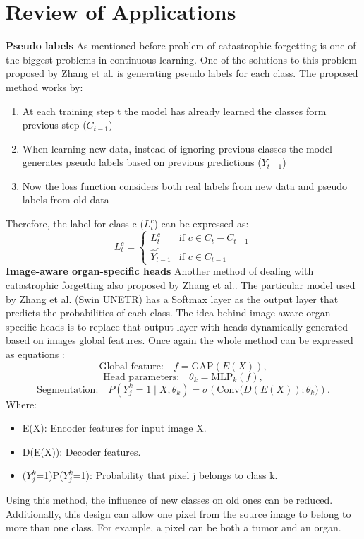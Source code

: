 \documentclass{IEEEcsmag}
\begin{document}
    \section{Review of Applications}
    \textbf{Pseudo labels} As mentioned before problem of catastrophic forgetting is one of the biggest problems in continuous learning.
    One of the solutions to this problem proposed by Zhang et al.\cite{cite-1} is generating pseudo labels for each class.
    The proposed method works by:
    \begin{enumerate}
        \item At each training step t the model has already learned the classes form previous step ($C_{t-1}$)
        \item When learning new data, instead of ignoring previous classes the model generates pseudo labels based on previous predictions ($Y_{t-1}$)
        \item Now the loss function considers both real labels from new data and pseudo labels from old data
    \end{enumerate}
    Therefore, the label for class c ($L^c_t$) can be expressed as:
        \[
            L^c_t =  
            \begin{cases}
                L^c_t & \text{if } c \in C_t - C_{t-1} \\
                \hat{Y}^c_{t-1} & \text{if } c \in C_{t-1}
            \end{cases}
        \]
    \textbf{Image-aware organ-specific heads} Another method of dealing with catastrophic forgetting also proposed by Zhang et al.\cite{cite-1}.
    The particular model used by Zhang et al. (Swin UNETR) has a Softmax layer as the output layer that predicts the probabilities of each class.
    The idea behind image-aware organ-specific heads is to replace that output layer with heads dynamically generated based on images global features.
    Once again the whole method can be expressed as equations :
        \[
            \text{Global feature:} \quad  f = \text{GAP}(E(X)),
        \]
        \[
            \text{Head parameters:} \quad \theta_k = \text{MLP}_k(f),
        \]
        \[
            \text{Segmentation:} \quad P(Y^k_j = 1 \mid X, \theta_k) = \sigma\left(\text{Conv}\big(D(E(X)); \theta_k\big)\right). 
        \]
    Where: 
    \begin{itemize}
        \item E(X): Encoder features for input image X.  
        \item D(E(X)): Decoder features. 
        \item($Y^k_j$=1)P($Y^k_j$=1): Probability that pixel j belongs to class k. 
    \end{itemize}
    Using this method, the influence of new classes on old ones can be reduced.
    Additionally, this design can allow one pixel from the source image to belong to more than one class.
    For example, a pixel can be both a tumor and an organ.
    
\end{document}
